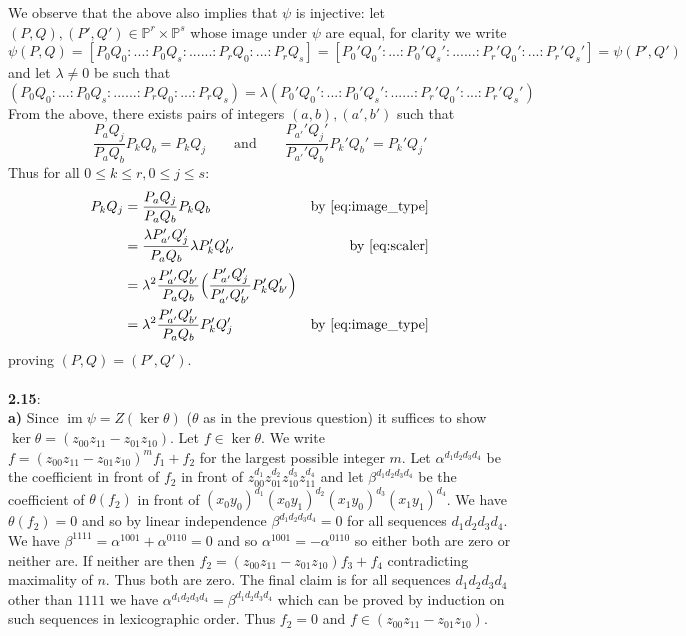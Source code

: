 \documentclass[12pt]{article}
\numberwithin{thm}{subsection}
\numberwithin{defn}{subsection}
\numberwithin{lemma}{subsection}
\numberwithin{example}{subsection}
\numberwithin{notation}{subsection}
\numberwithin{cor}{subsection}
\numberwithin{remark}{subsection}
\numberwithin{condition}{subsection}
\numberwithin{question}{subsection}
\numberwithin{construction}{subsection}
\numberwithin{construction}{subsection}
\numberwithin{construction}{subsection}
\newcommand{\bb}[1]{\mathbb{#1}}
\newcommand{\im}{\operatorname{im}}
\begin{document}
We observe that the above also implies that $\psi$ is injective: let $(P,Q),(P',Q') \in \bb{P}^r \times \bb{P}^s$ whose image under $\psi$ are equal, for clarity we write
\begin{equation}
    \psi(P,Q) = [P_0Q_0:...:P_0Q_s:......:P_rQ_0:...:P_rQ_s] = [P_0'Q_0':...:P_0'Q_s':......:P_r'Q_0':...:P_r'Q_s'] = \psi(P',Q')
\end{equation}
and let $\lambda \neq 0$ be such that 
\begin{equation}\label{eq:scaler}
(P_0Q_0:...:P_0Q_s:......:P_rQ_0:...:P_rQ_s) = \lambda (P_0'Q_0':...:P_0'Q_s':......:P_r'Q_0':...:P_r'Q_s')
\end{equation}
From the above, there exists pairs of integers $(a,b),(a',b')$ such that
\begin{equation}\label{eq:image_type}
    \frac{P_{a}Q_j}{P_{a}Q_b}P_kQ_b = P_kQ_j\qquad\text{and}\qquad \frac{P_{a'}'Q_j'}{P_{a'}'Q_b'}P_k'Q_b' = P_k'Q_j'
\end{equation}
Thus for all $0 \leq k \leq r, 0 \leq j \leq s$:
\begin{align*}
    P_kQ_j &= \frac{P_{a}Q_j}{P_{a}Q_b}P_kQ_b & \text{by }\eqref{eq:image_type}\\
    &= \frac{\lambda P'_{a'}Q'_j}{P_{a}Q_b}\lambda P'_kQ_{b'}' & \text{by }\eqref{eq:scaler}\\
    &= \lambda^2 \frac{P_{a'}'Q_{b'}'}{P_{a}Q_{b}} \Big(\frac{P_{a'}'Q_j'}{P_{a'}'Q_{b'}'}P_k'Q_{b'}'\Big)\\
    &= \lambda^2 \frac{P_{a'}'Q_{b'}'}{P_{a}Q_{b}} P_k'Q_j' & \text{by }\eqref{eq:image_type}
\end{align*}
proving $(P,Q) = (P',Q')$.\\\\
%
\textbf{2.15}:\\
\textbf{a)} Since $\im \psi = Z(\ker \theta)$ ($\theta$ as in the previous question) it suffices to show $\ker \theta = (z_{00}z_{11} - z_{01}z_{10})$. Let $f \in \ker \theta$. We write $f = (z_{00}z_{11} - z_{01}z_{10})^mf_1 + f_2$ for the largest possible integer $m$. Let $\alpha^{d_1d_2d_3d_4}$ be the coefficient in front of $f_2$ in front of $z_{00}^{d_1}z_{01}^{d_2}z_{10}^{d_3}z_{11}^{d_4}$ and let $\beta^{d_1d_2d_3d_4}$ be the coefficient of $\theta(f_2)$ in front of $(x_0y_0)^{d_1}(x_0y_1)^{d_2}(x_1y_0)^{d_3}(x_1y_1)^{d_4}$. We have $\theta(f_2) = 0$ and so by linear independence $\beta^{d_1d_2d_3d_4} = 0$ for all sequences $d_1d_2d_3d_4$. We have $\beta^{1111} = \alpha^{1001} + \alpha^{0110} = 0$ and so $\alpha^{1001} = -\alpha^{0110}$ so either both are zero or neither are. If neither are then $f_2 = (z_{00}z_{11} - z_{01}z_{10})f_3 + f_4$ contradicting maximality of $n$. Thus both are zero. The final claim is for all sequences $d_1d_2d_3d_4$ other than $1111$ we have $\alpha^{d_1d_2d_3d_4} = \beta^{d_1d_2d_3d_4}$ which can be proved by induction on such sequences in lexicographic order. Thus $f_2 = 0$ and $f \in (z_{00}z_{11} - z_{01}z_{10})$.\\\\
\end{document}

